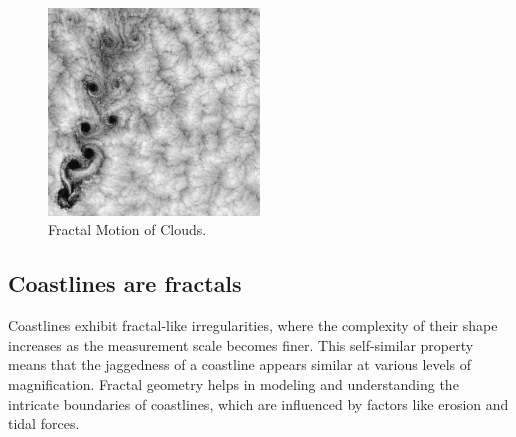\documentclass[12pt]{article}
\begin{document}
\begin{figure}[H]
\centering
\includegraphics[width=0.5\textwidth]{assets/fractal-clouds.jpg}
\caption{Fractal Motion of Clouds.}
\label{fig:fractal-clouds}
\end{figure}

\subsection{Coastlines are fractals}
Coastlines exhibit fractal-like irregularities, where the complexity of their shape increases as the measurement scale becomes finer. This self-similar property means that the jaggedness of a coastline appears similar at various levels of magnification. Fractal geometry helps in modeling and understanding the intricate boundaries of coastlines, which are influenced by factors like erosion and tidal forces.
\end{document}
